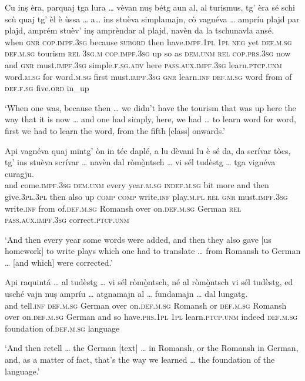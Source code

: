 \begin{linenumbers}
	\gll    Cu inṣ èra, parquaj tga lura … vèvan nuṣ bétg aun al, al turismus, tg’ èra sé schi scù quaj tg’ èl è ùssa … a… ins stuèva simplamajn, cò vagnéva …  ampríu plajd par plajd, amprém stuèv’ inṣ amprèndar al plajd, navèn da la tschunavla ansé.\\
	when \textsc{gnr} \textsc{cop.impf.3sg} because \textsc{subord} then {} have.\textsc{impf.1pl} \textsc{1pl} \textsc{neg} yet \textsc{def.m.sg} \textsc{def.m.sg} tourism \textsc{rel} \textsc{3sg.m} \textsc{cop.impf.3sg} up so as \textsc{dem.unm} \textsc{rel} \textsc{cop.prs.3sg} now {} and \textsc{gnr} must.\textsc{impf.3sg} simple.\textsc{f.sg.adv} here \textsc{pass.aux.impf.3sg} {} learn.\textsc{ptcp.unm} word.\textsc{m.sg} for word.\textsc{m.sg} first must.\textsc{impf.3sg} \textsc{gnr} learn.\textsc{inf} \textsc{def.m.sg} word from of \textsc{def.f.sg} five.\textsc{ord} in\_up\\
\end{linenumbers}
\medskip
\glt `When one was, because then … we didn’t have the tourism that was up here the way that it is now … and one had simply, here, we had … to learn word for word, first we had to learn the word, from the fifth [class] onwards.'
\medskip

\begin{linenumbers}
	\gll    Api vagnéva quaj mintg’ òn in téc daplé, a lu dèvani lu è sé da, da scrívar tòcs, tg’ ins stuèva scrívar … navèn dal ròmò̱ntsch … vi sél tudèstg … tga vignéva curagju.\\
	and come.\textsc{impf.3sg} \textsc{dem.unm} every year.\textsc{m.sg} \textsc{indef.m.sg} bit more and then give.\textsc{3pl.3pl} then also up \textsc{comp} \textsc{comp} write.\textsc{inf} play.\textsc{m.pl} \textsc{rel} \textsc{gnr} must.\textsc{impf.3sg} write.\textsc{inf} {} from  of.\textsc{def.m.sg} Romansh {} over on.\textsc{def.m.sg} German {} \textsc{rel} \textsc{pass.aux.impf.3sg} correct.\textsc{ptcp.unm}\\
\end{linenumbers}
\medskip
\glt `And then every year some words were added, and then they also gave [us homework] to write plays which one had to translate … from Romansh to German … [and which] were corrected.'
\medskip

\begin{linenumbers}
	\gll    Api raquintá … al tudèstg … vi sél ròmò̱ntsch, né al ròmò̱ntsch vi sél tudèstg, ed usché vajn nuṣ ampríu … atgnamajn al … fundamajn … dal  lungatg.\\
	and tell.\textsc{inf} {} \textsc{def.m.sg} German {} over on.\textsc{def.m.sg} Romansh or  \textsc{def.m.sg} Romansh over  on.\textsc{def.m.sg} German and so have.\textsc{prs.1pl} \textsc{1pl} learn.\textsc{ptcp.unm} {} indeed \textsc{def.m.sg} {} foundation {} of.\textsc{def.m.sg} language\\
\end{linenumbers}
\medskip
\glt `And then retell … the German [text] … in Romansh, or the Romansh in German, and, as a matter of fact, that’s the way we learned … the foundation of the language.'


